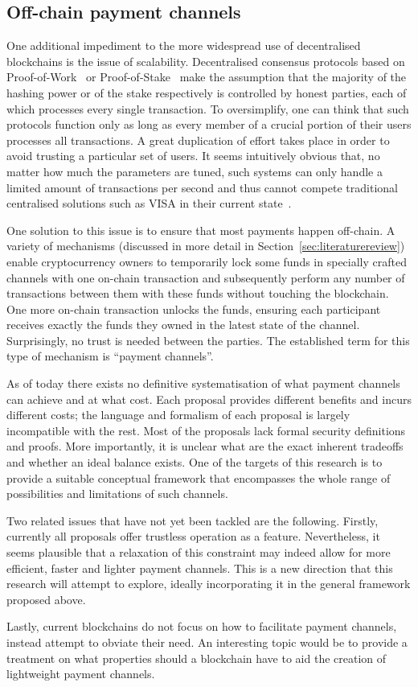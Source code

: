 \subsection{Off-chain payment channels}
  One additional impediment to the more widespread use of decentralised blockchains is the
  issue of scalability. Decentralised consensus protocols based on
  Proof-of-Work~\cite{hashcash} or Proof-of-Stake~\cite{ouroboros} make the assumption
  that the majority of the hashing power or of the stake respectively is controlled by
  honest parties, each of which processes every single transaction. To oversimplify, one
  can think that such protocols function only as long as every member of a crucial portion
  of their users processes all transactions. A great duplication of effort takes place in
  order to avoid trusting a particular set of users. It seems intuitively obvious that, no
  matter how much the parameters are tuned, such systems can only handle a limited amount
  of transactions per second and thus cannot compete traditional centralised solutions
  such as VISA in their current state~\cite{tps}.

  One solution to this issue is to ensure that most payments happen off-chain. A variety
  of mechanisms (discussed in more detail in Section~\ref{sec:literaturereview}) enable
  cryptocurrency owners to temporarily lock some funds in specially crafted channels with
  one on-chain transaction and subsequently perform any number of transactions between
  them with these funds without touching the blockchain. One more on-chain transaction
  unlocks the funds, ensuring each participant receives exactly the funds they owned in
  the latest state of the channel. Surprisingly, no trust is needed between the parties.
  The established term for this type of mechanism is ``payment channels''.

  As of today there exists no definitive systematisation of what payment channels can
  achieve and at what cost. Each proposal provides different benefits and incurs different
  costs; the language and formalism of each proposal is largely incompatible with the
  rest. Most of the proposals lack formal security definitions and proofs. More
  importantly, it is unclear what are the exact inherent tradeoffs and whether an ideal
  balance exists. One of the targets of this research is to provide a suitable conceptual
  framework that encompasses the whole range of possibilities and limitations of such
  channels.

  Two related issues that have not yet been tackled are the following. Firstly, currently
  all proposals offer trustless operation as a feature. Nevertheless, it seems plausible
  that a relaxation of this constraint may indeed allow for more efficient, faster and
  lighter payment channels. This is a new direction that this research will attempt to
  explore, ideally incorporating it in the general framework proposed above.

  Lastly, current blockchains do not focus on how to facilitate payment channels, instead
  attempt to obviate their need. An interesting topic would be to provide a treatment on
  what properties should a blockchain have to aid the creation of lightweight payment
  channels.
